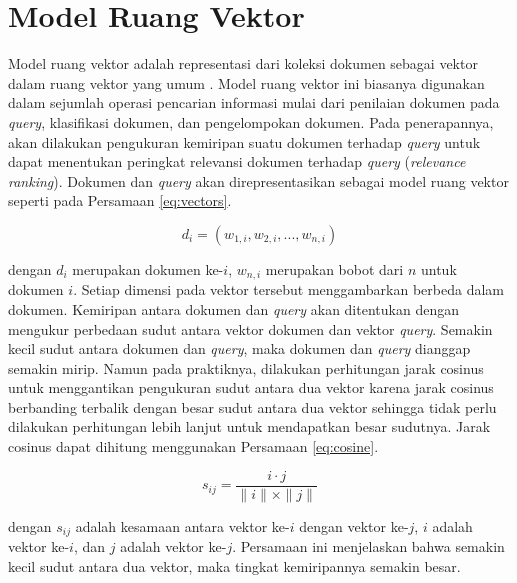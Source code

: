 \section{Model Ruang Vektor}
\label{sec:vsm}
Model ruang vektor adalah representasi dari koleksi dokumen sebagai vektor dalam ruang vektor yang umum \cite{schutze2008introduction}. Model ruang vektor ini biasanya digunakan dalam sejumlah operasi pencarian informasi mulai dari penilaian dokumen pada \textit{query}, klasifikasi dokumen, dan pengelompokan dokumen. Pada penerapannya, akan dilakukan pengukuran kemiripan suatu dokumen terhadap \textit{query} untuk dapat menentukan peringkat relevansi dokumen terhadap \textit{query} (\textit{relevance ranking}). Dokumen dan \textit{query} akan direpresentasikan sebagai model ruang vektor seperti pada Persamaan \ref{eq:vectors}.

\begin{equation}
\label{eq:vectors}
	d_i = (w_{1,i}, w_{2,i}, ..., w_{n,i})
\end{equation}

dengan $d_i$ merupakan dokumen ke-$i$, $w_{n,i}$ merupakan bobot dari \term $n$ untuk dokumen $i$. Setiap dimensi pada vektor tersebut menggambarkan \term berbeda dalam dokumen. Kemiripan antara dokumen dan \textit{query} akan ditentukan dengan mengukur perbedaan sudut antara vektor dokumen dan vektor \textit{query}. Semakin kecil sudut antara dokumen dan \textit{query}, maka dokumen dan \textit{query} dianggap semakin mirip. Namun pada praktiknya, dilakukan perhitungan jarak cosinus untuk menggantikan pengukuran sudut antara dua vektor karena jarak cosinus berbanding terbalik dengan besar sudut antara dua vektor sehingga tidak perlu dilakukan perhitungan lebih lanjut untuk mendapatkan besar sudutnya. Jarak cosinus dapat dihitung menggunakan Persamaan \ref{eq:cosine}.

\begin{equation}
\label{eq:cosine}
s_{ij}=\frac{i\cdot j}{\parallel i \parallel \times \parallel j \parallel}
\end{equation}

dengan $s_{ij}$ adalah kesamaan antara vektor ke-$i$ dengan vektor ke-$j$, $i$ adalah vektor ke-$i$, dan $j$ adalah vektor ke-$j$. Persamaan ini menjelaskan bahwa semakin kecil sudut antara dua vektor, maka tingkat kemiripannya semakin besar.  

